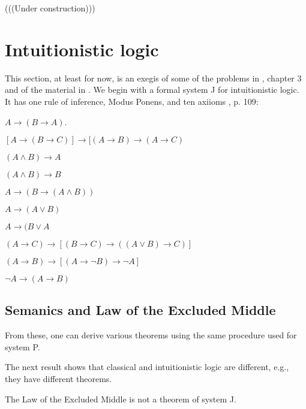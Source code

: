 
\begin{mathmacro}
\newcommand{\set}[1]{\{ #1 \}}
\newcommand{\opensets}[0]{\mathcal{O}}
\newcommand{\for}[0]{\mathcal{F}}
\newcommand{\axioms}[0]{\mathcal{A}}
\newcommand{\theorems}[0]{\mathcal{T}}
\end{mathmacro}

(((Under construction)))


\section{Intuitionistic logic}

\innertableofcontents

This section, at least for now, is an exegis of some of the problems in \cite{RH}, chapter 3 and of the material in \cite{WKIL}.  We begin with a formal system J for intuitionistic logic. It has one rule of inference, Modus Ponens, and ten axiioms \cite{RH}, p. 109:

 $A \to (B \to A)$.

 $[A \to (B \to C)] \to [(A \to B) \to (A \to C) $

 $(A \land B) \to A$

 $(A \land B) \to B$

 $A \to (B \to (A \land B)) $

 $A \to (A \lor B)$

 $A \to (B \lor A$

 $(A \to C) \to [(B \to C) \to ((A \lor B) \to C)] $

 $(A \to B) \to [(A \to \neg B) \to \neg A ] $

 $\neg A \to (A \to B) $

\subsection{Semanics and Law of the Excluded Middle}

From these, one can derive various theorems using the same procedure used for system P.

The next result shows that classical  and intuitionistic logic are different, e.g., they have different theorems.

\begin{theorem}  \label{lem} The Law of the Excluded Middle is not a theorem of system J.
\end{theorem}


